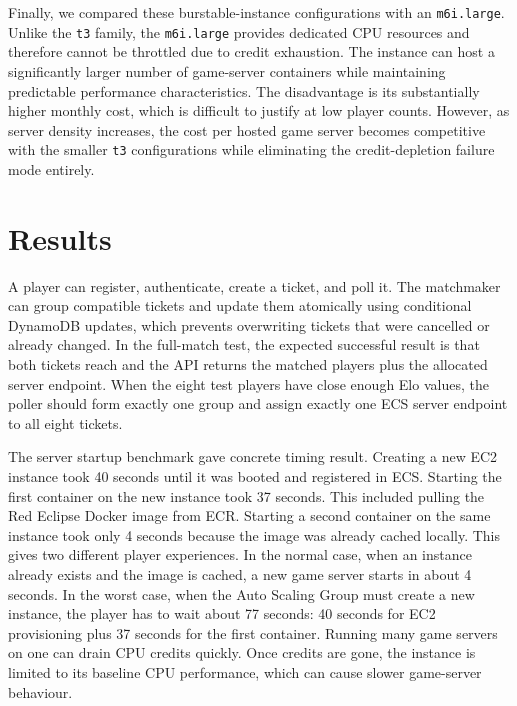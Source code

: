 \documentclass[9pt,a4paper,twocolumn,twoside]{tau-class/tau}
\begin{document}
   Finally, we compared these burstable-instance configurations with an \texttt{m6i.large}. Unlike the \texttt{t3} family, the \texttt{m6i.large} provides dedicated CPU resources and therefore cannot be throttled due to credit exhaustion. The instance can host a significantly larger number of game-server containers while maintaining predictable performance characteristics. 
   The disadvantage is its substantially higher monthly cost, which is difficult to justify at low player counts. However, as server density increases, the cost per hosted game server becomes competitive with the smaller \texttt{t3} configurations while eliminating the credit-depletion failure mode entirely.


\section{Results}

A player can register, authenticate, create a ticket, and poll it. The matchmaker can group compatible tickets and update them atomically using conditional DynamoDB updates, which prevents overwriting tickets that were cancelled or already changed. In the full-match test, the expected successful result is that both tickets reach  and the API returns the matched players plus the allocated server endpoint.
When the eight test players have close enough Elo values, the poller should form exactly one group and assign exactly one ECS server endpoint to all eight tickets. 

The server startup benchmark gave concrete timing result. Creating a new EC2 instance took 40 seconds until it was booted and registered in ECS. Starting the first container on the new instance took 37 seconds. This included pulling the Red Eclipse Docker image from ECR. Starting a second container on the same instance took only 4 seconds because the image was already cached locally.
This gives two different player experiences. In the normal case, when an instance already exists and the image is cached, a new game server starts in about 4 seconds. In the worst case, when the Auto Scaling Group must create a new instance, the player has to wait about 77 seconds: 40 seconds for EC2 provisioning plus 37 seconds for the first container. 
Running many game servers on one  can drain CPU credits quickly. Once credits are gone, the instance is limited to its baseline CPU performance, which can cause slower game-server behaviour.
\end{document}
